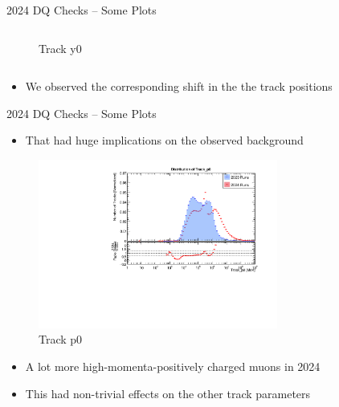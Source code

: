 \begin{frame}{2024 DQ Checks -- Some Plots}
\begin{columns}
\begin{column}{0.5 \textwidth}
\begin{figure}
                \caption{Track y0}
            \end{figure}
        \end{column}
    \end{columns}
    \begin{itemize}
        \item We observed the corresponding shift in the the track positions
    \end{itemize}
\end{frame}

\begin{frame}{2024 DQ Checks -- Some Plots}
    \begin{itemize}
        \item That had huge implications on the observed background
    \end{itemize}

        \begin{figure}
            \centering
            \includegraphics[width=0.7\textwidth]{assets/Track_p0.pdf}
            \caption{Track p0}
        \end{figure}
    \begin{itemize}
        \item A lot more high-momenta-positively charged muons in 2024
        \item This had non-trivial effects on the other track parameters
    \end{itemize}
\end{frame}


